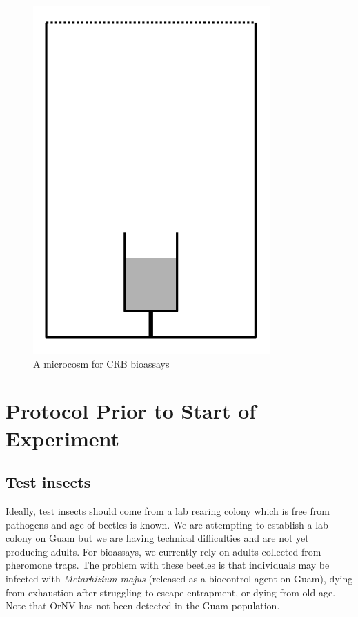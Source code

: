 \documentclass[twocolumn, 12pt,letterpaper,english,bibliography=totocnumbered, abstract=on]{scrartcl}
\begin{document}
\begin{figure}
	\centering
	\includegraphics[width=0.7\linewidth]{images/setup.png}
	\caption{A microcosm for CRB bioassays}
	\label{fig:setup}
\end{figure}

\section{Protocol Prior to Start of Experiment}

\subsection{Test insects}

Ideally, test insects should come from a lab rearing colony which is free from pathogens and age of beetles is known. We are attempting to establish a lab colony on Guam but we are having technical difficulties and are not yet producing adults. For bioassays, we currently rely on adults collected from pheromone traps. The problem with these beetles is that individuals may be infected with \textit{Metarhizium majus} (released as a biocontrol agent on Guam), dying from exhaustion after struggling to escape entrapment, or dying from old age. Note that OrNV has not been detected in the Guam population.
\end{document}
